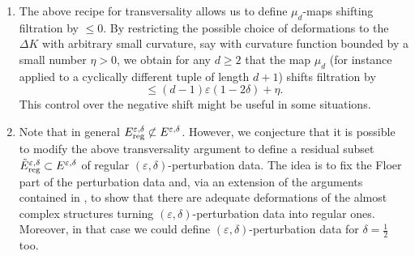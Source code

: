 	\begin{rem}
		\begin{enumerate}
			\item The above recipe for transversality allows us to define $\mu_d$-maps shifting filtration by $\leq 0$. By restricting the possible choice of deformations to the $\Delta K$ with arbitrary small curvature, say with curvature function bounded by a small number $\eta>0$, we obtain for any $d\geq 2$ that the map $\mu_d$ (for instance applied to a cyclically different tuple of length $d+1$) shifts filtration by $$\leq (d-1)\varepsilon(1-2\delta)+\eta.$$ This control over the negative shift might be useful in some situations.
			\item Note that in general $E^{\varepsilon,\delta}_\textnormal{reg}\not\subset E^{\varepsilon,\delta}$. However, we conjecture that it is possible to modify the above transversality argument to define a residual subset $\tilde{E}^{\varepsilon,\delta}_\textnormal{reg}\subset E^{\varepsilon,\delta}$ of regular $(\varepsilon,\delta)$-perturbation data. The idea is to fix the Floer part of the perturbation data and, via an extension of the arguments contained in \cite{McD-Sa:jhol}, to show that there are adequate deformations of the almost complex structures turning $(\varepsilon,\delta)$-perturbation data into regular ones.  Moreover, in that case we could define $(\varepsilon,\delta)$-perturbation data for $\delta=\frac{1}{2}$ too.
		\end{enumerate}
	\end{rem}
	
	
	
	
